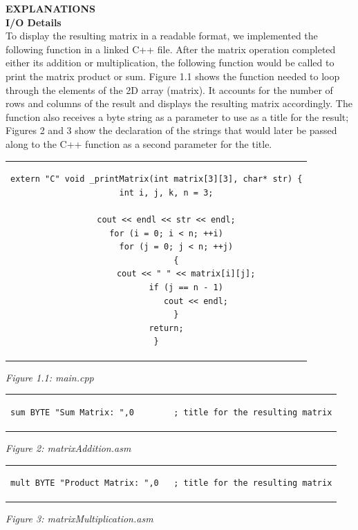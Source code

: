 \documentclass[twoside]{article}
\begin{document}
\noindent \textbf{EXPLANATIONS}
\noindent \\ \textbf{I/O Details}
\\To display the resulting matrix in a readable format, we implemented the following function in a linked C++ file. After the matrix operation completed either its addition or multiplication, the following function would be called to print the matrix product or sum. Figure 1.1 shows the function needed to loop through the elements of the 2D array (matrix). It accounts for the number of rows and columns of the result and displays the resulting matrix accordingly. The function also receives a byte string as a parameter to use as a title for the result; Figures 2 and 3 show the declaration of the strings that would later be passed along to the C++ function as a second parameter for the title.
\begin{center} \begin{tabular}{c} \begin{lstlisting}
extern "C" void _printMatrix(int matrix[3][3], char* str) {
	int i, j, k, n = 3;

	cout << endl << str << endl;
	for (i = 0; i < n; ++i)
		for (j = 0; j < n; ++j)
		{
			cout << " " << matrix[i][j];
			if (j == n - 1)
				cout << endl;
		}
	return;
}
\end{lstlisting} \end{tabular} \end{center}
\begin{center}\textit{Figure 1.1: main.cpp}\end{center}
\begin{center} \begin{tabular}{c} \begin{lstlisting}
sum BYTE "Sum Matrix: ",0        ; title for the resulting matrix
\end{lstlisting} \end{tabular} \end{center}
\begin{center}\textit{Figure 2: matrixAddition.asm}\end{center}
\begin{center} \begin{tabular}{c} \begin{lstlisting}
mult BYTE "Product Matrix: ",0   ; title for the resulting matrix
\end{lstlisting} \end{tabular} \end{center}
\begin{center}\textit{Figure 3: matrixMultiplication.asm}\end{center}
\end{document}

